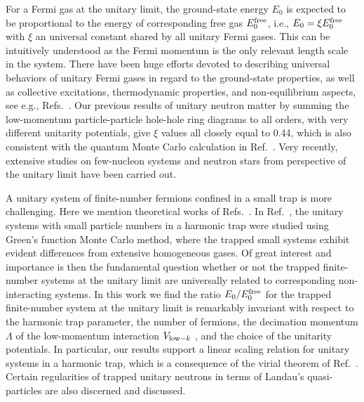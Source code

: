 \documentclass[twocolumn,preprintnumbers,superscriptaddress]{revtex4}
\begin{document}
For a Fermi gas at the unitary limit, the ground-state energy $E_0$
is expected to be proportional to the energy of corresponding free gas $E_0^{\rm free}$,
i.e., $E_0=\xi E_0^{\rm free}$ with $\xi$ an universal constant shared by all unitary Fermi gases.
This can be intuitively understood as the Fermi momentum is the only relevant length scale in the system.
There have been huge efforts devoted to describing universal behaviors of unitary Fermi gases
in regard to the ground-state properties, as well as collective excitations, thermodynamic properties,
and non-equilibrium aspects, see e.g.,
Refs.~\cite{Jr1999,Heiselberg2001,Carlson2003,Perali2004,Bulgac2005,Nishida2006,Haussmann2007,Schaefer2007,Siu2008,Dong2010,Schaefer2010,exp1,exp2,exp3,exp4,exp5,exp6,exp7,exp8,exp9}.
Our previous results of unitary neutron matter \cite{Siu2008,Dong2010}
by summing the low-momentum particle-particle hole-hole
ring diagrams to all orders,
with very different unitarity potentials, give $\xi$
values all closely equal to 0.44,
which is also consistent with the quantum
Monte Carlo calculation in Ref.~\cite{Carlson2003}.
Very recently, extensive studies on few-nucleon systems
\cite{Konig2017,Kievsky2018} and neutron stars \cite{Kievsky2018}
from perspective of the unitary limit
have been carried out.

A unitary system of finite-number fermions confined in a small trap is more challenging.
Here we mention theoretical works of Refs.~\cite{Werner2006,virial,Chang2007,Blume2007}.
In Ref.~\cite{Chang2007}, the unitary systems with small particle numbers in a harmonic trap were studied
using Green's function Monte Carlo method, where the trapped small systems exhibit evident differences from extensive homogeneous gases.
Of great interest and importance is then the fundamental question whether or not
the trapped finite-number systems at the unitary limit are universally related to corresponding non-interacting systems.
In this work we find the ratio $E_0/E_0^{\rm free}$ for the trapped finite-number system at the unitary limit
is remarkably invariant with respect to the harmonic trap parameter,
the number of fermions, the decimation momentum $\Lambda$ of the low-momentum interaction
$V_{{\rm low}-k}$ \cite{vlowk1,vlowk2,vlowk3,vlowk4,vlowk5,vlowk6,vlowk7},
and the choice of the unitarity potentials.
In particular, our results support a linear scaling relation for unitary systems in a harmonic trap,
which is a consequence of the virial theorem of Ref.~\cite{virial}.
Certain regularities of trapped unitary neutrons in terms of Landau's quasi-particles \cite{MBT}
are also discerned and discussed.
\end{document}
